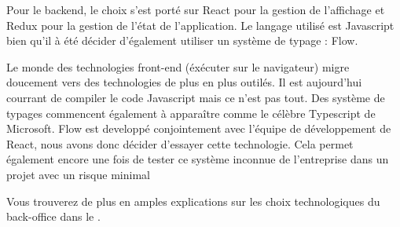   Pour le backend, le choix s'est porté sur React pour la gestion de l'affichage et Redux pour la gestion de l'état de l'application. Le langage utilisé est Javascript bien qu'il à été décider d'également utiliser un système de typage : Flow.

  Le monde des technologies front-end (éxécuter sur le navigateur) migre doucement vers des technologies de plus en plus outilés. Il est aujourd'hui courrant de \gls{compiler} le code \gls{Javascript} mais ce n'est pas tout. Des système de typages commencent également à apparaître comme le célèbre \gls{Typescript} de Microsoft. Flow est developpé conjointement avec l'équipe de développement de React, nous avons donc décider d'essayer cette technologie. Cela permet également encore une fois de tester ce système inconnue de l'entreprise dans un projet avec un risque minimal

  Vous trouverez de plus en amples explications sur les choix technologiques du back-office dans le .